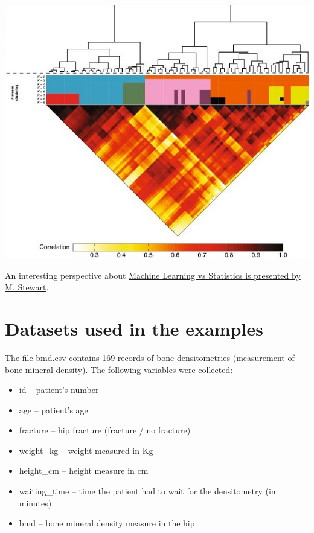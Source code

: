 \documentclass[
]{book}
\providecommand{\tightlist}{%
  \setlength{\itemsep}{0pt}\setlength{\parskip}{0pt}}
\begin{document}
\begin{center}\includegraphics[width=1\linewidth]{pattern} \end{center}

An interesting perspective about \href{https://towardsdatascience.com/the-actual-difference-between-statistics-and-machine-learning-64b49f07ea3}{Machine Learning vs Statistics is presented
by M. Stewart}.

\hypertarget{datasets-used-in-the-examples}{%
\section*{Datasets used in the examples}\label{datasets-used-in-the-examples}}

The file \href{https://www.dropbox.com/s/7wjsfdaf0wt2kg2/bmd.csv?dl=1}{bmd.csv}
contains 169 records of bone densitometries (measurement of
bone mineral density). The following variables were collected:

\begin{itemize}
\tightlist
\item
  id -- patient's number\\
\item
  age -- patient's age
\item
  fracture -- hip fracture (fracture / no fracture)
\item
  weight\_kg -- weight measured in Kg
\item
  height\_cm -- height measure in cm\\
\item
  waiting\_time -- time the patient had to wait for the densitometry (in minutes)
\item
  bmd -- bone mineral density measure in the hip
\end{itemize}
\end{document}
